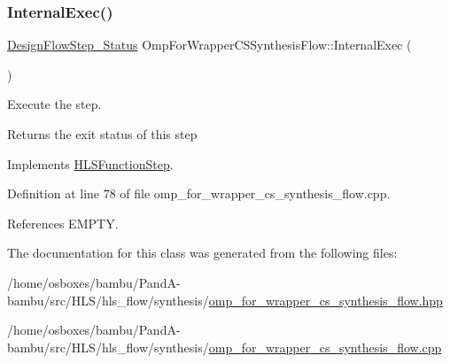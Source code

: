\mbox{\label{classOmpForWrapperCSSynthesisFlow_adf4ac0c27066d673830c29b594b80b4e}} 
\subsubsection{\texorpdfstring{Internal\+Exec()}{InternalExec()}}
{\footnotesize\ttfamily \hyperlink{design__flow__step_8hpp_afb1f0d73069c26076b8d31dbc8ebecdf}{Design\+Flow\+Step\+\_\+\+Status} Omp\+For\+Wrapper\+C\+S\+Synthesis\+Flow\+::\+Internal\+Exec (\begin{DoxyParamCaption}{ }\end{DoxyParamCaption})\hspace{0.3cm}{\ttfamily [virtual]}}



Execute the step. 

\begin{DoxyReturn}{Returns}
the exit status of this step 
\end{DoxyReturn}


Implements \hyperlink{classHLSFunctionStep_a8db4c00d080655984d98143206fc9fa8}{H\+L\+S\+Function\+Step}.



Definition at line 78 of file omp\+\_\+for\+\_\+wrapper\+\_\+cs\+\_\+synthesis\+\_\+flow.\+cpp.



References E\+M\+P\+TY.



The documentation for this class was generated from the following files\+:\begin{DoxyCompactItemize}
\item 
/home/osboxes/bambu/\+Pand\+A-\/bambu/src/\+H\+L\+S/hls\+\_\+flow/synthesis/\hyperlink{omp__for__wrapper__cs__synthesis__flow_8hpp}{omp\+\_\+for\+\_\+wrapper\+\_\+cs\+\_\+synthesis\+\_\+flow.\+hpp}\item 
/home/osboxes/bambu/\+Pand\+A-\/bambu/src/\+H\+L\+S/hls\+\_\+flow/synthesis/\hyperlink{omp__for__wrapper__cs__synthesis__flow_8cpp}{omp\+\_\+for\+\_\+wrapper\+\_\+cs\+\_\+synthesis\+\_\+flow.\+cpp}\end{DoxyCompactItemize}
